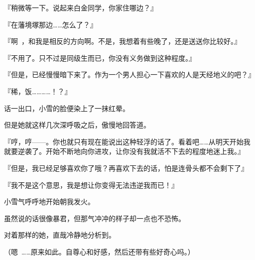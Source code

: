 『稍微等一下。说起来白金同学，你家住哪边？』

『在藩境塚那边……怎么了？』

『啊~，和我是相反的方向啊。不是，我想着有些晚了，还是送送你比较好。』

『不用了。只不过是同级生而已，你没有义务做到这种程度。』

『但是，已经慢慢暗下来了。作为一个男人担心一下喜欢的人是天经地义的吧？』

『稀，饭…………！？』

话一出口，小雪的脸便染上了一抹红晕。

但是她就这样几次深呼吸之后，傲慢地回答道。

『哼，哼——。你也就只有现在能说出这种轻浮的话了。看着吧……从明天开始我就要逆袭了。开始不断地向你进攻，让你没有我就活不下去的程度地迷上我。』

『但是，我已经足够喜欢你了哦？再喜欢下去的话，怕是连骨头都不会剩下了』

『我不是这个意思，我是想让你变得无法违逆我而已！』

小雪气呼呼地开始朝我发火。

虽然说的话很像暴君，但那气冲冲的样子却一点也不恐怖。

对着那样的她，直哉冷静地分析到。

（嗯~……原来如此。自尊心和好感，然后还带有些好奇心吗。）

